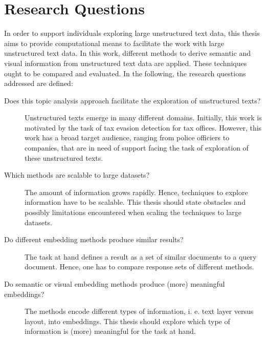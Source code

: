 \section{Research Questions}\label{sec:research-questions}

In order to support individuals exploring large unstructured text data, 
this thesis aims to provide computational means to facilitate the work with large unstructured text data.
In this work, different methods to derive semantic and visual information from unstructured text data are applied.
These techniques ought to be compared and evaluated.
In the following, the research questions addressed are defined:
\begin{description}
    \item[Does this topic analysis approach facilitate the exploration of unstructured texts?]
    Unstructured texts emerge in many different domains.
    Initially, this work is motivated by the task of tax evasion detection for tax offices.
    However, this work has a broad target audience, ranging from police officiers to companies, 
    that are in need of support facing the task of exploration of these unstructured texts.

    \item[Which methods are scalable to large datasets?]
    The amount of information grows rapidly.
    Hence, techniques to explore information have to be scalable.
    This thesis should state obstacles and possibly limitations encountered when scaling the techniques to large datasets.

    \item[Do different embedding methods produce similar results?]
    The task at hand defines a result as a set of similar documents to a query document.
    Hence, one has to compare response sets of different methods.

    \item[Do semantic or visual embedding methods produce (more) meaningful embeddings?]
    The methods encode different types of information, i. e. text layer versus layout, into embeddings. 
    This thesis should explore which type of information is (more) meaningful for the task at hand.


\end{description}

